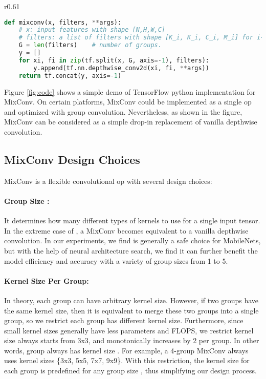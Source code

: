 \documentclass{sty/bmvc2k}
\begin{document}
\begin{wrapfigure}{r}{0.61\linewidth}
\tiny                                                                                          
\begin{lstlisting}[language=python]   
def mixconv(x, filters, **args):                                       
    # x: input features with shape [N,H,W,C]                                        
    # filters: a list of filters with shape [K_i, K_i, C_i, M_i] for i-th group.
    G = len(filters)    # number of groups.
    y = []                                                                     
    for xi, fi in zip(tf.split(x, G, axis=-1), filters):
        y.append(tf.nn.depthwise_conv2d(xi, fi, **args))
    return tf.concat(y, axis=-1)
\end{lstlisting}       
\vskip -0.1in                                                             
\caption{A demo of TensorFlow MixConv.}                            
\label{fig:code}                                                                    
\end{wrapfigure} 
 Figure \ref{fig:code} shows a simple demo of TensorFlow python implementation for MixConv.  On certain platforms, MixConv could be implemented as a single op and optimized with group convolution. Nevertheless, as shown in the figure, MixConv can be considered as a  simple drop-in replacement of vanilla depthwise convolution.



\subsection{MixConv Design Choices}

MixConv is a flexible convolutional op with several design choices:

\paragraph{Group Size :} It determines how many different types of kernels to use for a single input tensor. In the extreme case of , a MixConv becomes equivalent to a vanilla depthwise convolution. In our experiments, we find  is generally a safe choice for MobileNets, but with the help of neural architecture search, we find it can further benefit the model efficiency and accuracy with a variety of group sizes from 1 to 5.

\paragraph{Kernel Size Per Group:} In theory, each group can have arbitrary kernel size. However, if two groups have the same kernel size, then it is equivalent to merge these two groups into a single group, so we restrict each group has different kernel size. Furthermore, since small kernel sizes generally have less parameters and FLOPS, we restrict kernel size always starts from 3x3, and monotonically increases by 2 per group. In other words, group  always has kernel size . For example, a 4-group MixConv always uses kernel sizes \{3x3, 5x5, 7x7, 9x9\}. With this restriction, the kernel size for each group is predefined for any group size , thus simplifying our design process.
\end{document}
